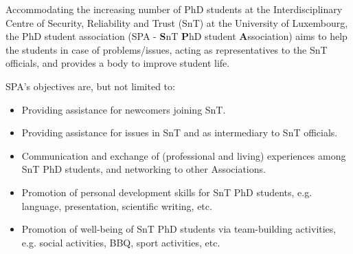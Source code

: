 \label{ssec_SPA}
Accommodating the increasing number of PhD students at the Interdisciplinary Centre of Security, Reliability and Trust (SnT) at the University of Luxembourg, the PhD student association (SPA - \textbf{S}nT \textbf{P}hD student \textbf{A}ssociation) aims to help the students in case of problems/issues, acting as representatives to the SnT officials, and provides a body to improve student life. 

SPA's objectives are, but not limited to:
\begin{itemize}
	\item Providing assistance for newcomers joining SnT.
	\item Providing assistance for issues in SnT and as intermediary to SnT officials. 
	\item Communication and exchange of (professional and living) experiences among SnT PhD students, and networking to other Associations.
	\item Promotion of personal development skills for SnT PhD students, e.g. language, presentation, scientific writing, etc.
	\item Promotion of well-being of SnT PhD students via team-building activities, e.g. social activities, BBQ, sport activities, etc. 
\end{itemize}

